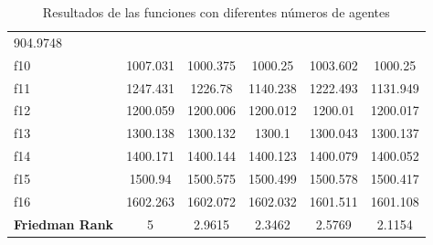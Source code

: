 \documentclass[conference]{IEEEtran}
\begin{document}
\begin{table}[h]
{\begin{tabular}{lccccc}
            904.9748                                                            \\
            f10                           & 1007.031
                                          & 1000.375                          &
            1000.25                       & 1003.602                          &
            1000.25                                                             \\
            f11                           & 1247.431
                                          & 1226.78                           &
            1140.238                      & 1222.493                          &
            1131.949                                                            \\
            f12                           & 1200.059
                                          & 1200.006                          &
            1200.012                      & 1200.01                           &
            1200.017                                                            \\
            f13                           & 1300.138
                                          & 1300.132                          &
            1300.1                        & 1300.043                          &
            1300.137                                                            \\
            f14                           & 1400.171
                                          & 1400.144                          &
            1400.123                      & 1400.079                          &
            1400.052                                                            \\
            f15                           & 1500.94
                                          & 1500.575                          &
            1500.499                      & 1500.578                          &
            1500.417                                                            \\
            f16                           & 1602.263
                                          & 1602.072                          &
            1602.032                      & 1601.511                          &
            1601.108                                                            \\
            \hline
            \textbf{Friedman Rank}        & 5
                                          & 2.9615                            &
            2.3462                        & 2.5769                            &
            2.1154                                                              \\
            \hline
        \end{tabular}%
    }
    \caption{Resultados de las funciones con diferentes números de agentes}
    \label{tab:agentes}
\end{table}
\end{document}

